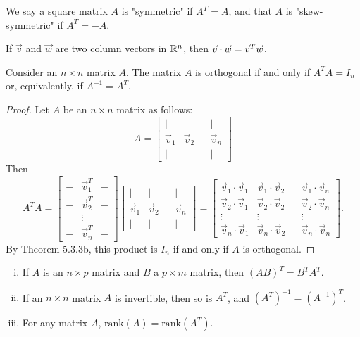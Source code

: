 \documentclass[a4paper,8pt]{article}
\begin{document}
\begin{outline}
    We say a square matrix \(A\) is "symmetric" if \(A^T = A\), and that \(A\) is "skew-symmetric" if \(A^T = -A\).

    If \(\vec{v}\) and \(\vec{w}\) are two column vectors in \(\mathbb{R}^n\), then \(\vec{v}\cdot\vec{w} = \vec{v}^T\vec{w}\).

    Consider an \(n \times n\) matrix \(A\). The matrix \(A\) is orthogonal if and only if \(A^TA = I_n\) or, equivalently,
    if \(A^{-1} = A^T\).

    \begin{proof}
      Let \(A\) be an \(n \times n\) matrix as follows:
      \[ A = \begin{bmatrix} \vert & \vert & & \vert \\ \vec{v}_1 & \vec{v}_2 & & \vec{v}_n \\ \vert & \vert & & \vert \end{bmatrix} \]
      Then
      \[
      A^TA = \begin{bmatrix}- & \vec{v}_1^T & - \\ - & \vec{v}_2^T & - \\ & \vdots & \\  - & \vec{v}_n^T & -\end{bmatrix}
             \begin{bmatrix} \vert & \vert & & \vert \\ \vec{v}_1 & \vec{v}_2 & & \vec{v}_n \\ \vert & \vert & & \vert \end{bmatrix}
           = \begin{bmatrix}
               \vec{v}_1\cdot\vec{v}_1 & \vec{v}_1\cdot\vec{v}_2 & & \vec{v}_1\cdot\vec{v}_n\\
               \vec{v}_2\cdot\vec{v}_1 & \vec{v}_2\cdot\vec{v}_2 & & \vec{v}_2\cdot\vec{v}_n\\
               \vdots & \vdots & & \vdots                                                   \\
               \vec{v}_n\cdot\vec{v}_1 & \vec{v}_n\cdot\vec{v}_2 & & \vec{v}_n\cdot\vec{v}_n
             \end{bmatrix}
             \text{.}
      \]
      By Theorem 5.3.3b, this product is \(I_n\) if and only if \(A\) is orthogonal.
    \end{proof}

    \begin{enumerate}[i.]
      \item If \(A\) is an \(n \times p\) matrix and \(B\) a \(p \times m\) matrix, then \((AB)^T = B^TA^T\).
      \item If an \(n \times n\) matrix \(A\) is invertible, then so is \(A^T\), and \((A^T)^{-1} = (A^{-1})^T\).
      \item For any matrix \(A\), \(\text{rank}(A) = \text{rank}(A^T)\).
    \end{enumerate}


\end{outline}
\end{document}
